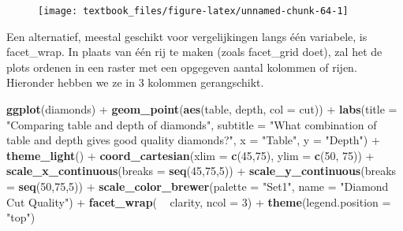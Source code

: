 \documentclass[]{tufte-book}
\newenvironment{Shaded}{}{}
\newcommand{\DataTypeTok}[1]{\textcolor[rgb]{0.56,0.13,0.00}{#1}}
\newcommand{\DecValTok}[1]{\textcolor[rgb]{0.25,0.63,0.44}{#1}}
\newcommand{\KeywordTok}[1]{\textcolor[rgb]{0.00,0.44,0.13}{\textbf{#1}}}
\newcommand{\NormalTok}[1]{#1}
\newcommand{\OperatorTok}[1]{\textcolor[rgb]{0.40,0.40,0.40}{#1}}
\newcommand{\StringTok}[1]{\textcolor[rgb]{0.25,0.44,0.63}{#1}}
\begin{document}
\begin{figure}
\texttt{[image: textbook\_files/figure-latex/unnamed-chunk-64-1]} \end{figure}

Een alternatief, meestal geschikt voor vergelijkingen langs één variabele, is facet\_wrap. In plaats van één rij te maken (zoals facet\_grid doet), zal het de plots ordenen in een raster met een opgegeven aantal kolommen of rijen. Hieronder hebben we ze in 3 kolommen gerangschikt.

\begin{Shaded}
\begin{Highlighting}[]
\KeywordTok{ggplot}\NormalTok{(diamonds) }\OperatorTok{+}
\StringTok{    }\KeywordTok{geom_point}\NormalTok{(}\KeywordTok{aes}\NormalTok{(table, depth, }\DataTypeTok{col =}\NormalTok{ cut)) }\OperatorTok{+}\StringTok{ }
\StringTok{    }\KeywordTok{labs}\NormalTok{(}\DataTypeTok{title =} \StringTok{"Comparing table and depth of diamonds"}\NormalTok{,}
         \DataTypeTok{subtitle =} \StringTok{"What combination of table and depth gives good quality diamonds?"}\NormalTok{,}
         \DataTypeTok{x =} \StringTok{"Table"}\NormalTok{,}
         \DataTypeTok{y =} \StringTok{"Depth"}\NormalTok{) }\OperatorTok{+}
\StringTok{    }\KeywordTok{theme_light}\NormalTok{() }\OperatorTok{+}
\StringTok{    }\KeywordTok{coord_cartesian}\NormalTok{(}\DataTypeTok{xlim =} \KeywordTok{c}\NormalTok{(}\DecValTok{45}\NormalTok{,}\DecValTok{75}\NormalTok{), }\DataTypeTok{ylim =} \KeywordTok{c}\NormalTok{(}\DecValTok{50}\NormalTok{, }\DecValTok{75}\NormalTok{)) }\OperatorTok{+}
\StringTok{    }\KeywordTok{scale_x_continuous}\NormalTok{(}\DataTypeTok{breaks =} \KeywordTok{seq}\NormalTok{(}\DecValTok{45}\NormalTok{,}\DecValTok{75}\NormalTok{,}\DecValTok{5}\NormalTok{)) }\OperatorTok{+}
\StringTok{    }\KeywordTok{scale_y_continuous}\NormalTok{(}\DataTypeTok{breaks =} \KeywordTok{seq}\NormalTok{(}\DecValTok{50}\NormalTok{,}\DecValTok{75}\NormalTok{,}\DecValTok{5}\NormalTok{)) }\OperatorTok{+}
\StringTok{    }\KeywordTok{scale_color_brewer}\NormalTok{(}\DataTypeTok{palette =} \StringTok{"Set1"}\NormalTok{, }\DataTypeTok{name =} \StringTok{"Diamond Cut Quality"}\NormalTok{) }\OperatorTok{+}
\StringTok{    }\KeywordTok{facet_wrap}\NormalTok{( }\OperatorTok{~}\StringTok{ }\NormalTok{clarity, }\DataTypeTok{ncol =} \DecValTok{3}\NormalTok{) }\OperatorTok{+}
\StringTok{    }\KeywordTok{theme}\NormalTok{(}\DataTypeTok{legend.position =} \StringTok{"top"}\NormalTok{)}
\end{Highlighting}
\end{Shaded}
\end{document}
